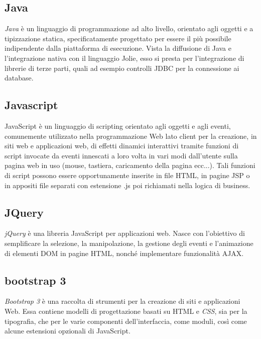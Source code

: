 \subsection{Java}
 \textit{Java} è un linguaggio di programmazione ad alto livello, orientato agli oggetti e a tipizzazione statica, specificatamente progettato per essere il più possibile indipendente dalla piattaforma di esecuzione. Vista la diffusione di Java e l'integrazione nativa con il linguaggio Jolie, esso si presta per l'integrazione di librerie di terze parti, quali ad esempio controlli JDBC per la connessione ai database. 
 
\subsection{Javascript}
JavaScript è un linguaggio di scripting orientato agli oggetti e agli eventi, comunemente utilizzato nella programmazione Web lato client per la creazione, in siti web e applicazioni web, di effetti dinamici interattivi tramite funzioni di script invocate da eventi innescati a loro volta in vari modi dall'utente sulla pagina web in uso (mouse, tastiera, caricamento della pagina ecc...). Tali funzioni di script possono essere opportunamente inserite in file HTML, in pagine JSP o in appositi file separati con estensione .js poi richiamati nella logica di business.

\subsection{JQuery}
\textit{jQuery} è una libreria JavaScript per applicazioni web. Nasce con l'obiettivo di semplificare la selezione, la manipolazione, la gestione degli eventi e l'animazione di elementi DOM in pagine HTML, nonché implementare funzionalità AJAX. 

\subsection{bootstrap 3}
\textit{Bootstrap 3} è una raccolta di strumenti per la creazione di siti e applicazioni Web. Essa contiene modelli di progettazione basati su HTML e \textit{CSS}, sia per la tipografia, che per le varie componenti dell’interfaccia, come moduli, così come alcune estensioni opzionali di JavaScript.